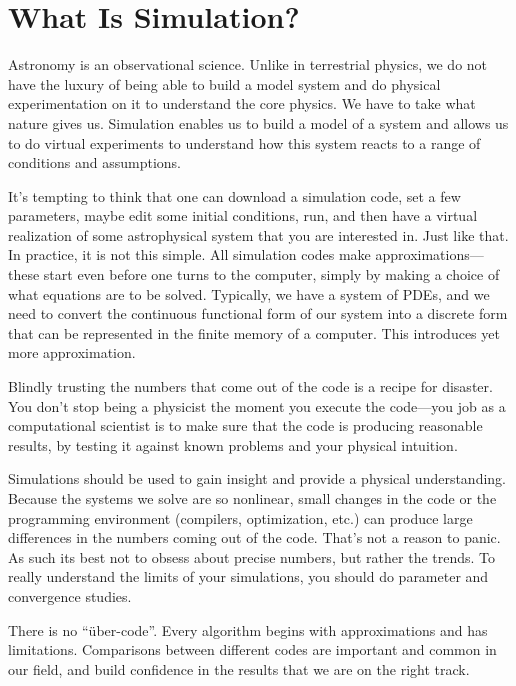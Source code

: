 \section{What Is Simulation?}

Astronomy is an observational science.  Unlike in terrestrial physics,
we do not have the luxury of being able to build a model system and do
physical experimentation on it to understand the core physics.  We
have to take what nature gives us.  Simulation enables us to build a
model of a system and allows us to do virtual experiments to
understand how this system reacts to a range of conditions and
assumptions.

It's tempting to think that one can download a simulation code, set a
few parameters, maybe edit some initial conditions, run, and then have
a virtual realization of some astrophysical system that you are
interested in.  Just like that.  In practice, it is not this simple.
All simulation codes make approximations---these start even before one
turns to the computer, simply by making a choice of what equations are
to be solved.  Typically, we have a system of PDEs, and we need to
convert the continuous functional form of our system into a discrete
form that can be represented in the finite memory of a computer.  This
introduces yet more approximation.


Blindly trusting the numbers that come out of the code is a recipe
for disaster.  You don't stop being a physicist the moment you execute
the code---you job as a computational scientist is to make sure that
the code is producing reasonable results, by testing it against known
problems and your physical intuition.  

Simulations should be used to gain insight and provide a physical
understanding.  
Because the systems we solve are so nonlinear, small changes in the
code or the programming environment (compilers, optimization, etc.)
can produce large differences in the numbers coming out of the code.
That's not a reason to panic.
As such its best not to obsess about precise numbers, but rather the
trends.  To really understand the limits of your simulations, you
should do parameter and convergence studies.

There is no ``\"uber-code''.  Every algorithm begins with approximations
and has limitations.  Comparisons between different codes are
important and common in our field, and build confidence in the
results that we are on the right track.

